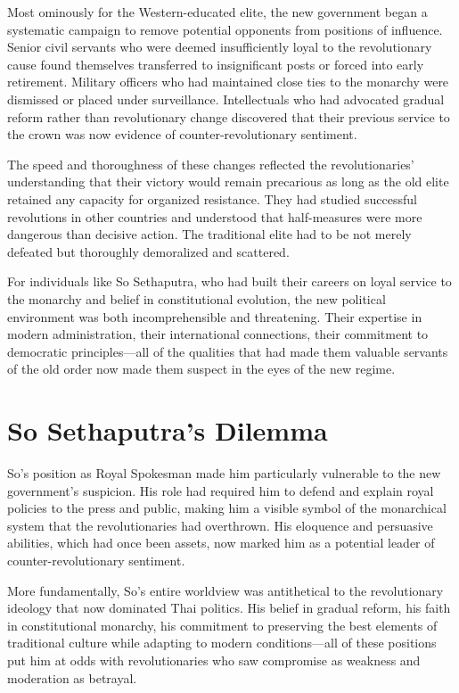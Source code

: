 \documentclass[
  Letterpaper,
]{scrbook}
\begin{document}
Most ominously for the Western-educated elite, the new government began
a systematic campaign to remove potential opponents from positions of
influence. Senior civil servants who were deemed insufficiently loyal to
the revolutionary cause found themselves transferred to insignificant
posts or forced into early retirement. Military officers who had
maintained close ties to the monarchy were dismissed or placed under
surveillance. Intellectuals who had advocated gradual reform rather than
revolutionary change discovered that their previous service to the crown
was now evidence of counter-revolutionary sentiment.

The speed and thoroughness of these changes reflected the
revolutionaries' understanding that their victory would remain
precarious as long as the old elite retained any capacity for organized
resistance. They had studied successful revolutions in other countries
and understood that half-measures were more dangerous than decisive
action. The traditional elite had to be not merely defeated but
thoroughly demoralized and scattered.

For individuals like So Sethaputra, who had built their careers on loyal
service to the monarchy and belief in constitutional evolution, the new
political environment was both incomprehensible and threatening. Their
expertise in modern administration, their international connections,
their commitment to democratic principles---all of the qualities that
had made them valuable servants of the old order now made them suspect
in the eyes of the new regime.

\section{So Sethaputra's Dilemma}\label{so-sethaputras-dilemma}

So's position as Royal Spokesman made him particularly vulnerable to the
new government's suspicion. His role had required him to defend and
explain royal policies to the press and public, making him a visible
symbol of the monarchical system that the revolutionaries had
overthrown. His eloquence and persuasive abilities, which had once been
assets, now marked him as a potential leader of counter-revolutionary
sentiment.

More fundamentally, So's entire worldview was antithetical to the
revolutionary ideology that now dominated Thai politics. His belief in
gradual reform, his faith in constitutional monarchy, his commitment to
preserving the best elements of traditional culture while adapting to
modern conditions---all of these positions put him at odds with
revolutionaries who saw compromise as weakness and moderation as
betrayal.
\end{document}
